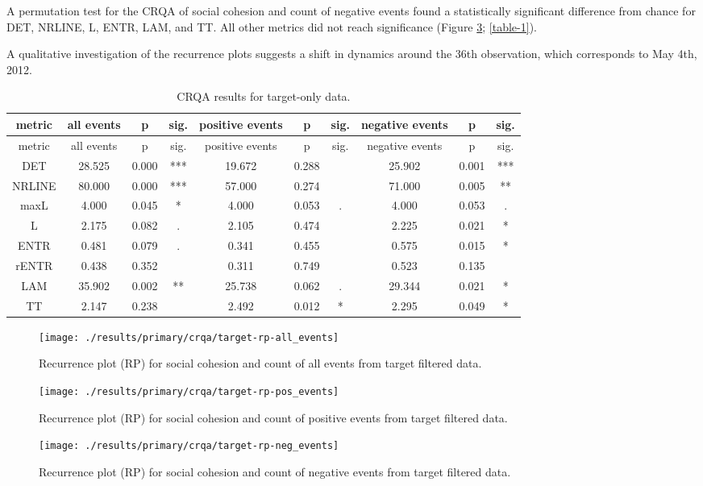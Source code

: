 \documentclass[
  english,
  man]{apa6}
\begin{document}
A permutation test for the CRQA of social cohesion and count of negative events
found a statistically significant difference from chance for DET, NRLINE, L,
ENTR, LAM, and TT. All other metrics did not reach significance (Figure
\ref{fig:plot-rp-targ-neg}; \autoref{table-1}).

A qualitative investigation of the recurrence plots suggests a shift in dynamics
around the 36th observation, which corresponds to May 4th, 2012.

\begin{longtable}[]{@{}cccccccccc@{}}
\caption{\label{table-1}CRQA results for target-only data.}\tabularnewline
\toprule
metric & all events & p & sig. & positive events & p & sig. & negative events & p & sig.\tabularnewline
\midrule
\endfirsthead
\toprule
metric & all events & p & sig. & positive events & p & sig. & negative events & p & sig.\tabularnewline
\midrule
\endhead
DET & 28.525 & 0.000 & *** & 19.672 & 0.288 & & 25.902 & 0.001 & ***\tabularnewline
NRLINE & 80.000 & 0.000 & *** & 57.000 & 0.274 & & 71.000 & 0.005 & **\tabularnewline
maxL & 4.000 & 0.045 & * & 4.000 & 0.053 & . & 4.000 & 0.053 & .\tabularnewline
L & 2.175 & 0.082 & . & 2.105 & 0.474 & & 2.225 & 0.021 & *\tabularnewline
ENTR & 0.481 & 0.079 & . & 0.341 & 0.455 & & 0.575 & 0.015 & *\tabularnewline
rENTR & 0.438 & 0.352 & & 0.311 & 0.749 & & 0.523 & 0.135 &\tabularnewline
LAM & 35.902 & 0.002 & ** & 25.738 & 0.062 & . & 29.344 & 0.021 & *\tabularnewline
TT & 2.147 & 0.238 & & 2.492 & 0.012 & * & 2.295 & 0.049 & *\tabularnewline
\bottomrule
\end{longtable}

\begin{figure}
\texttt{[image: ./results/primary/crqa/target-rp-all\_events]} \caption{Recurrence plot (RP) for social cohesion and count of all events from target filtered data.}\label{fig:plot-rp-targ-all}
\end{figure}

\begin{figure}
\texttt{[image: ./results/primary/crqa/target-rp-pos\_events]} \caption{Recurrence plot (RP) for social cohesion and count of positive events from target filtered data.}\label{fig:plot-rp-targ-pos}
\end{figure}

\begin{figure}
\texttt{[image: ./results/primary/crqa/target-rp-neg\_events]} \caption{Recurrence plot (RP) for social cohesion and count of negative events from target filtered data.}\label{fig:plot-rp-targ-neg}
\end{figure}
\end{document}
